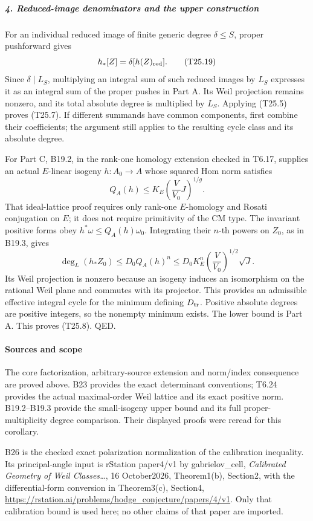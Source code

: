 \documentclass[11pt,a4paper]{article}
\theoremstyle{definition}
\begin{document}
\subparagraph{4. Reduced-image denominators and the upper construction}\label{reduced-image-denominators-and-the-upper-construction}

For an individual reduced image of finite generic degree \(\delta\le S\), proper pushforward gives \[
 h_*[Z]=\delta[h(Z)_{\rm red}].
 \tag{T25.19}
\] Since \(\delta\mid L_S\), multiplying an integral sum of such reduced images by \(L_S\) expresses it as an integral sum of the proper pushes in Part A. Its Weil projection remains nonzero, and its total absolute degree is multiplied by \(L_S\). Applying (T25.5) proves (T25.7). If different summands have common components, first combine their coefficients; the argument still applies to the resulting cycle class and its absolute degree.

For Part C, B19.2, in the rank-one homology extension checked in T6.17, supplies an actual \(E\)-linear isogeny \(h:A_0\to A\) whose squared Hom norm satisfies \[
 Q_A(h)\le K_E\left(\frac V{V_0}J\right)^{1/g}.
 \tag{T25.20}
\] That ideal-lattice proof requires only rank-one \(E\)-homology and Rosati conjugation on \(E\); it does not require primitivity of the CM type. The invariant positive forms obey \(h^*\omega\le Q_A(h)\omega_0\). Integrating their \(n\)-th powers on \(Z_0\), as in B19.3, gives \[
 \deg_L(h_*Z_0)
    \le D_0Q_A(h)^n
    \le D_0K_E^n\left(\frac V{V_0}\right)^{1/2}\sqrt J.
 \tag{T25.21}
\] Its Weil projection is nonzero because an isogeny induces an isomorphism on the rational Weil plane and commutes with its projector. This provides an admissible effective integral cycle for the minimum defining \(D_{\rm tr}\). Positive absolute degrees are positive integers, so the nonempty minimum exists. The lower bound is Part A. This proves (T25.8). QED.

\paragraph{Sources and scope}\label{sources-and-scope}

The core factorization, arbitrary-source extension and norm/index consequence are proved above. B23 provides the exact determinant conventions; T6.24 provides the actual maximal-order Weil lattice and its exact positive norm. B19.2--B19.3 provide the small-isogeny upper bound and its full proper-multiplicity degree comparison. Their displayed proofs were reread for this corollary.

B26 is the checked exact polarization normalization of the calibration inequality. Its principal-angle input is rStation paper4/v1 by gabrielov\_cell, \emph{Calibrated Geometry of Weil Classes\ldots{}}, 16 October2026, Theorem1(b), Section2, with the differential-form conversion in Theorem3(c), Section4, \url{https://rstation.ai/problems/hodge_conjecture/papers/4/v1}. Only that calibration bound is used here; no other claims of that paper are imported.
\end{document}
